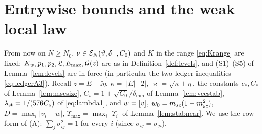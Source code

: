 \section{Entrywise bounds and the weak local law}\label{sec:weak}
From now on $N\ge N_0$, $\nu\in\mathcal E_N(\vartheta,\delta_\pm,C_0)$ and $K$ in the range \eqref{eq:Krange} are fixed; $K_w,p_1,p_2,\mathfrak{L},E_{\max},\mathcal{G}(z)$ are as in Definition~\ref{def:levels}, and (S1)--(S5) of Lemma~\ref{lem:levels} are in force
(in particular the two ledger inequalities \eqref{eq:ledgerA3}). Recall $z=E+\ii\eta$, $\kappa=||E|-2|$, $\varkappa=\sqrt{\kappa+\eta}$, the constants $c_*,C_*$ of Lemma~\ref{lem:mscsize}, $C_s=1+\sqrt{C_0}/\delta_{\min}$ of Lemma~\ref{lem:vecstab},
$\lambda_{\rm st}=1/(576C_s)$ of \eqref{eq:lambda1}, and $w=[v]$, $w_0=m_{sc}(1-m_{sc}^2)$, $D=\max_i|v_i-w|$, $\Upsilon_{\max}=\max_i|\Upsilon_i|$ of Lemma~\ref{lem:stabnear}. We use the row form of (A): $\sum_j\sigma_{ij}^2=1$ for every $i$ (since $\sigma_{ij}=\sigma_{ji}$).

